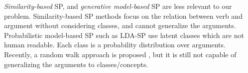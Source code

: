 {\em Similarity-based} SP\cite{clark2001class,erk2007simple},
and {\em generative model-based} SP\cite{Ritter:2010} are less relevant to
our problem. Similarity-based SP
methods focus on the relation between verb and argument without considering 
classes, and cannot generalize the arguments. Probabilistic model-based SP 
such as LDA-SP use latent classes which are not human readable.
Each class is a probability distribution over arguments. 
Recently, a random walk approach is proposed \cite{Tian13}, 
but it is still not capable of generalizing
the arguments to classes/concepts.

%



